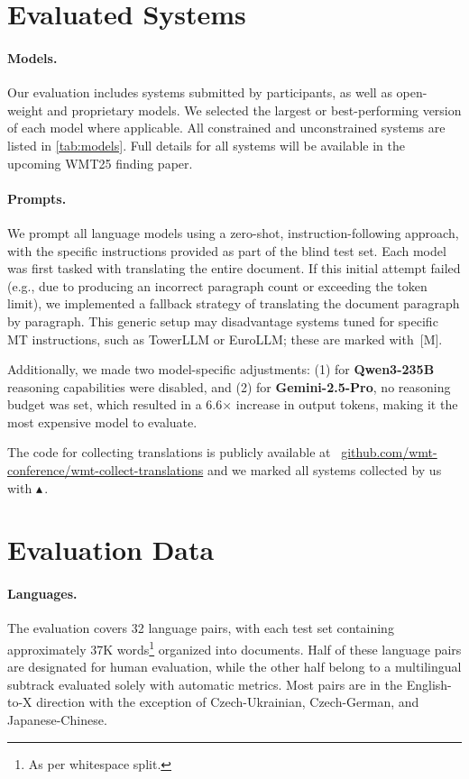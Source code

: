 \documentclass[11pt]{article}
\newcommand{\official}{\(\blacktriangle\)\,}
\begin{document}
\section*{Evaluated Systems}

\paragraph{Models.} Our evaluation includes systems submitted by participants, as well as open-weight and proprietary models. We selected the largest or best-performing version of each model where applicable. All constrained and unconstrained systems are listed in \autoref{tab:models}. Full details for all systems will be available in the upcoming WMT25 finding paper.






\paragraph{Prompts.} We prompt all language models using a zero-shot, instruction-following approach, with the specific instructions provided as part of the blind test set. Each model was first tasked with translating the entire document. If this initial attempt failed (e.g., due to producing an incorrect paragraph count or exceeding the token limit), we implemented a fallback strategy of translating the document paragraph by paragraph. This generic setup may disadvantage systems tuned for specific MT instructions, such as TowerLLM or EuroLLM; these are marked with~[M]. 


Additionally, we made two model-specific adjustments: (1) for \textbf{Qwen3-235B} reasoning capabilities were disabled, and (2) for \textbf{Gemini-2.5-Pro}, no reasoning budget was set, which resulted in a 6.6$\times$ increase in output tokens, making it the most expensive model to evaluate.


The code for collecting translations is publicly available at \faGithub\ \href{https://github.com/wmt-conference/wmt-collect-translations}{github.com/wmt-conference/wmt-collect-translations} and we marked all systems collected by us with \official{}.

\section*{Evaluation Data}

\paragraph{Languages.} The evaluation covers 32 language pairs, with each test set containing approximately 37K words\footnote{As per whitespace split.} organized into documents. Half of these language pairs are designated for human evaluation, while the other half belong to a multilingual subtrack evaluated solely with automatic metrics. Most pairs are in the English-to-X direction with the exception of Czech-Ukrainian, Czech-German, and Japanese-Chinese.
\end{document}
